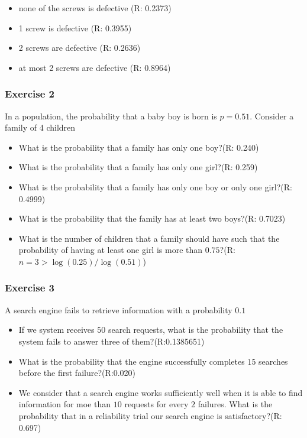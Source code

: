 \documentclass[
]{book}
\providecommand{\tightlist}{%
  \setlength{\itemsep}{0pt}\setlength{\parskip}{0pt}}
\begin{document}
\begin{itemize}
\tightlist
\item
  none of the screws is defective (R: 0.2373)
\item
  1 screw is defective (R: 0.3955)
\item
  2 screws are defective (R: 0.2636)
\item
  at most 2 screws are defective (R: 0.8964)
\end{itemize}

\hypertarget{exercise-2-4}{%
\subsubsection{Exercise 2}\label{exercise-2-4}}

In a population, the probability that a baby boy is born is \(p=0.51\). Consider a family of 4 children

\begin{itemize}
\tightlist
\item
  What is the probability that a family has only one boy?(R: 0.240)
\item
  What is the probability that a family has only one girl?(R: 0.259)
\item
  What is the probability that a family has only one boy or only one girl?(R: 0.4999)
\item
  What is the probability that the family has at least two boys?(R: 0.7023)
\item
  What is the number of children that a family should have such that the probability of having at least one girl is more than \(0.75\)?(R:\(n=3>\log(0.25)/\log(0.51)\))
\end{itemize}

\hypertarget{exercise-3-4}{%
\subsubsection{Exercise 3}\label{exercise-3-4}}

A search engine fails to retrieve information with a probability \(0.1\)

\begin{itemize}
\item
  If we system receives \(50\) search requests, what is the probability that the system fails to answer three of them?(R:0.1385651)
\item
  What is the probability that the engine successfully completes \(15\) searches before the first failure?(R:0.020)
\item
  We consider that a search engine works sufficiently well when it is able to find information for moe than \(10\) requests for every \(2\) failures. What is the probability that in a reliability trial our search engine is satisfactory?(R: 0.697)
\end{itemize}
\end{document}
